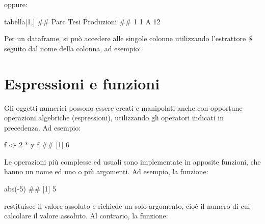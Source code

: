 \documentclass[a4paper,12pt,oneside]{book}
\newenvironment{Shaded}{\begin{snugshade}}{\end{snugshade}}
\newcommand{\DecValTok}[1]{#1}
\newcommand{\SpecialCharTok}[1]{#1}
\newcommand{\DocumentationTok}[1]{#1}
\newcommand{\OtherTok}[1]{#1}
\newcommand{\FunctionTok}[1]{#1}
\newcommand{\NormalTok}[1]{#1}
\begin{document}
oppure:

\begin{Shaded}
\begin{Highlighting}[]
\NormalTok{tabella[}\DecValTok{1}\NormalTok{,]}
\DocumentationTok{\#\#   Parc Tesi Produzioni}
\DocumentationTok{\#\# 1    1    A         12}
\end{Highlighting}
\end{Shaded}

Per un dataframe, si può accedere alle singole colonne utilizzando l'estrattore \emph{\$} seguito dal nome della colonna, ad esempio:

\begin{Shaded}
\end{Shaded}

\hypertarget{espressioni-e-funzioni}{%
\section{Espressioni e funzioni}\label{espressioni-e-funzioni}}

Gli oggetti numerici possono essere creati e manipolati anche con opportune operazioni algebriche (espressioni), utilizzando gli operatori indicati in precedenza. Ad esempio:

\begin{Shaded}
\begin{Highlighting}[]
\NormalTok{f  }\OtherTok{\textless{}{-}}  \DecValTok{2} \SpecialCharTok{*}\NormalTok{ y}
\NormalTok{f}
\DocumentationTok{\#\# [1] 6}
\end{Highlighting}
\end{Shaded}

Le operazioni più complesse ed usuali sono implementate in apposite funzioni, che hanno un nome ed uno o più argomenti. Ad esempio, la funzione:

\begin{Shaded}
\begin{Highlighting}[]
\FunctionTok{abs}\NormalTok{(}\SpecialCharTok{{-}}\DecValTok{5}\NormalTok{)}
\DocumentationTok{\#\# [1] 5}
\end{Highlighting}
\end{Shaded}

restituisce il valore assoluto e richiede un solo argomento, cioè il numero di cui calcolare il valore assoluto. Al contrario, la funzione:
\end{document}
